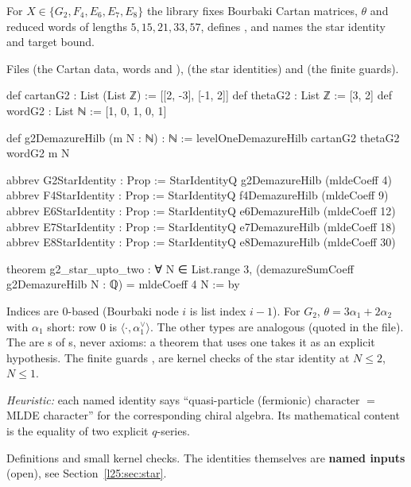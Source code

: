 \begin{definition}\label{l25:def:typedata}
For $X\in\{G_2,F_4,E_6,E_7,E_8\}$ the library fixes Bourbaki Cartan matrices, $\theta$ and reduced words of lengths
$5,15,21,33,57$, defines , and names the star identity and target bound.
\end{definition}
\noindent Files  (the Cartan
data, words and ), 
(the star identities) and  (the finite
guards).
\begin{leancode}
def cartanG2 : List (List ℤ) := [[2, -3], [-1, 2]]
def thetaG2 : List ℤ := [3, 2]
def wordG2 : List ℕ := [1, 0, 1, 0, 1]

def g2DemazureHilb (m N : ℕ) : ℕ := levelOneDemazureHilb cartanG2 thetaG2 wordG2 m N

abbrev G2StarIdentity : Prop := StarIdentityQ g2DemazureHilb (mldeCoeff 4)
abbrev F4StarIdentity : Prop := StarIdentityQ f4DemazureHilb (mldeCoeff 9)
abbrev E6StarIdentity : Prop := StarIdentityQ e6DemazureHilb (mldeCoeff 12)
abbrev E7StarIdentity : Prop := StarIdentityQ e7DemazureHilb (mldeCoeff 18)
abbrev E8StarIdentity : Prop := StarIdentityQ e8DemazureHilb (mldeCoeff 30)

theorem g2_star_upto_two : ∀ N ∈ List.range 3,
    (demazureSumCoeff g2DemazureHilb N : ℚ) = mldeCoeff 4 N := by
\end{leancode}
\begin{dictionary}
Indices are $0$-based (Bourbaki node $i$ is list index $i-1$). For $G_2$, $\theta=3\alpha_1+2\alpha_2$ with $\alpha_1$
short:  row $0$ is $\langle\cdot,\alpha_1^\vee\rangle$. The other types are analogous (quoted in the
file). The  are s of s, never axioms: a theorem that uses one takes it
as an explicit hypothesis. The finite guards ,  are kernel checks of the star identity at
$N\le2$, $N\le1$.
\end{dictionary}
\begin{physics}
\emph{Heuristic:} each named identity says ``quasi-particle (fermionic) character $=$ MLDE character'' for the
corresponding chiral algebra. Its mathematical content is the equality of two explicit $q$-series.
\end{physics}
\begin{status}
Definitions and small kernel checks. The identities themselves are \textbf{named inputs} (open), see
Section~\ref{l25:sec:star}.
\end{status}

